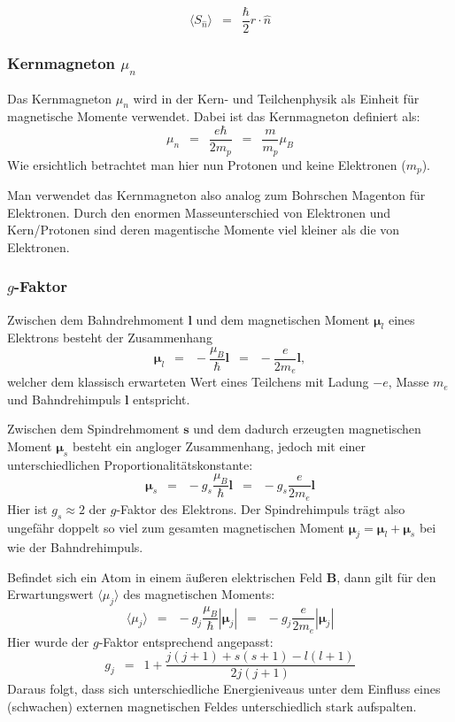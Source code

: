 \documentclass{article}
\newcommand{\widespace}{\enspace}
\newcommand{\wideeq}{\widespace = \widespace}
\begin{document}
\[
    \langle S_{\hat{n}} \rangle \wideeq \frac{\hbar}{2} r\cdot \hat{n}
\]

\subsubsection{Kernmagneton $\mu_n$}

Das Kernmagneton $\mu_n$ wird in der Kern- und Teilchenphysik als Einheit für magnetische Momente verwendet. Dabei ist das Kernmagneton definiert als: 
    \[
        \mu_n \wideeq \frac{e\hbar}{2m_p} \wideeq \frac{m}{m_p}\mu_B
    \]
Wie ersichtlich betrachtet man hier nun Protonen und keine Elektronen ($m_p$).

Man verwendet das Kernmagneton also analog zum Bohrschen Magenton für Elektronen. Durch den enormen Masseunterschied von Elektronen und Kern/Protonen sind deren magentische Momente viel kleiner als die von Elektronen. 

\subsubsection{$g$-Faktor}

\cite{Dem}

Zwischen dem Bahndrehmoment $\mathbf l$ und dem magnetischen Moment $\boldsymbol \mu_l$
eines Elektrons besteht der Zusammenhang
\[
    \boldsymbol \mu_l
    \wideeq - \frac{\mu_B}{\hbar} \mathbf l
    \wideeq - \frac{e}{2 m_e} \mathbf l,
\]
welcher dem klassisch erwarteten Wert eines Teilchens mit Ladung $-e$, Masse $m_e$
und Bahndrehimpuls $\mathbf l$ entspricht.

Zwischen dem Spindrehmoment $\mathbf s$ und dem dadurch erzeugten magnetischen Moment
$\boldsymbol \mu_s$ besteht ein angloger Zusammenhang, jedoch mit einer
unterschiedlichen Proportionalitätskonstante:
\[
    \boldsymbol \mu_s
    \wideeq - g_s \frac{\mu_B}{\hbar} \mathbf l
    \wideeq - g_s \frac{e}{2 m_e} \mathbf l
\]
Hier ist $g_s \approx 2$ der $g$-Faktor des Elektrons. Der Spindrehimpuls
trägt also ungefähr doppelt so viel zum gesamten magnetischen Moment
$\boldsymbol \mu_j = \boldsymbol \mu_l + \boldsymbol \mu_s$ bei wie der Bahndrehimpuls.

Befindet sich ein Atom in einem äußeren elektrischen Feld $\mathbf B$,
dann gilt für den Erwartungswert $\langle \mu_j \rangle$
des magnetischen Moments:
\[
    \langle \mu_j \rangle
    \wideeq - g_j \frac{\mu_B}{\hbar} | \boldsymbol \mu_j |
    \wideeq - g_j \frac{e}{2 m_e} | \boldsymbol \mu_j |
\]
Hier wurde der $g$-Faktor entsprechend angepasst:
\[
    g_j \wideeq 1 + \frac{j (j + 1) + s (s + 1) - l (l + 1)}{2 j (j + 1)}
\]
Daraus folgt, dass sich unterschiedliche Energieniveaus unter dem Einfluss
eines (schwachen) externen magnetischen Feldes unterschiedlich stark aufspalten.
\end{document}
